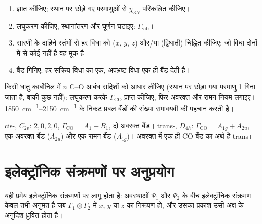 \begin{method}[कंपनिक स्पेक्ट्रम की भविष्यवाणी]\label{met:b3:group-theory-applied:vibrations}
\begin{enumerate}
  \item {} ज्ञात कीजिए; स्थान पर छोड़े गए परमाणुओं से $\chi_{3N}$ परिकलित कीजिए।
  \item लघुकरण कीजिए, स्थानांतरण और घूर्णन घटाइए: $\Gamma_{\mathrm{vib}}$।
  \item सारणी के दाहिने स्तंभों से हर विधा को 
        ($x$, $y$, $z$) और/या  (द्विघाती) चिह्नित कीजिए; जो विधा दोनों में से कोई
        नहीं है वह मूक है।
  \item बैंड गिनिए: हर सक्रिय विधा का एक, अपभ्रष्ट विधा एक ही बैंड देती है।
\end{enumerate}
\end{method}

\begin{method}[CO तननों की गिनती]\label{met:b3:group-theory-applied:co-count}
किसी धातु कार्बोनिल में $n$ C--O आबंध सदिशों को आधार लीजिए (स्थान पर छोड़ा गया
परमाणु 1 गिना जाता है, बाकी कुछ नहीं): लघुकरण करके $\Gamma_{\mathrm{CO}}$ प्राप्त कीजिए, फिर
अवरक्त और रामन नियम लगाइए।
\qtyrange{1850}{2150}{cm^{-1}} के निकट प्रबल बैंडों की संख्या समावयवी की पहचान करती है।
\end{method}

\begin{example}[सिस और ट्रांस]\label{ex:b3:group-theory-applied:cis-trans}
cis-, $C_{2v}$:  $2, 0, 2, 0$, $\Gamma_{\mathrm{CO}} = A_1 + B_1$,
दो अवरक्त बैंड। trans-, $D_{4h}$: $\Gamma_{\mathrm{CO}} = A_{1g} + A_{2u}$, एक
अवरक्त बैंड ($A_{2u}$) और एक रामन बैंड ($A_{1g}$)। अवरक्त में एक ही CO बैंड
का अर्थ है trans।
\end{example}

\section{इलेक्ट्रॉनिक संक्रमणों पर अनुप्रयोग}

यही प्रमेय इलेक्ट्रॉनिक संक्रमणों पर लागू होता है: अवस्थाओं $\Psi_1$ और $\Psi_2$ के बीच
इलेक्ट्रॉनिक संक्रमण केवल तभी अनुमत है जब $\Gamma_1\otimes\Gamma_2$ में
$x$, $y$ या $z$ का निरूपण हो, और उसका प्रकाश
उसी अक्ष के अनुदिश ध्रुवित होता है।

